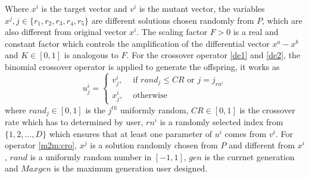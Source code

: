\documentclass[journal]{IEEEtran}
\begin{document}
Where $x^i$ is the target vector and $v^i$ is the mutant vector, the variables $x^j, j \in \{r_1,r_2,r_3,r_4,r_5\}$ are different solutions chosen randomly from $P$, which are also different from original vector $x^i$. The scaling factor $F > 0$ is a real and constant factor which controls the amplification of the differential vector $x^a-x^b$ and $K \in [0,1]$ is analogous to $F$. For the crossover operator \ref{de1} and \ref{de2}, the binomial crossover operator \cite{storn1997differential} is applied to generate the offspring, it works as
\begin{equation}
  u_{j}^{i}=\left\{\begin{array}{ll}
    v_{j}^{i}, & \text { if }  { rand_j } \leq C R \text { or } j=j_{ {rn^i }} \\
    x_{j}^{i}, & \text { otherwise }
  \end{array}\right.
\end{equation}
where $rand_j \in [0,1]$ is the $j^{th}$ uniformly random, $CR \in [0,1]$ is the crossover rate which has to determined by user, $rn^i$ is a randomly selected index from $\{1,2,\dots,D\}$ which ensures that at least one parameter of $u^i$ comes from $v^i$.
For operator \ref{m2m:cro}, $x^j$ is a solution randomly chosen from $P$ and different from $x^i$, $rand$ is a uniformly random number in $[-1,1]$, $gen$ is the currnet generation and $Maxgen$ is the maximum generation user designed.
\end{document}
